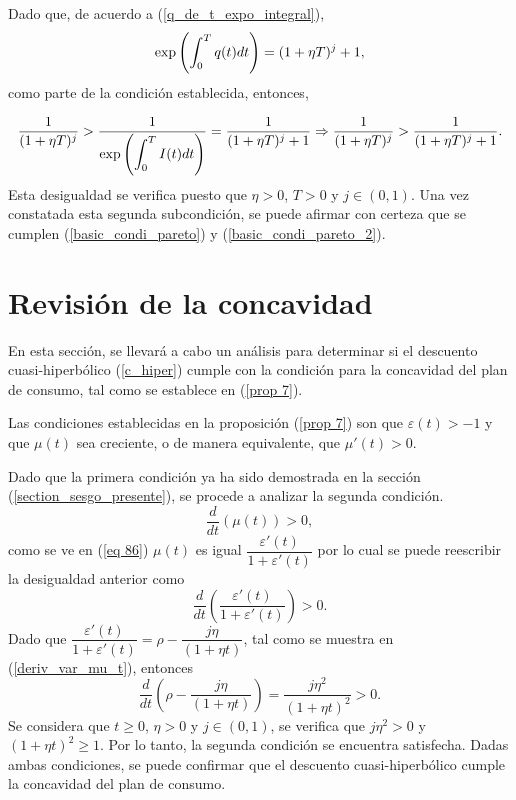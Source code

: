 Dado que, de acuerdo a (\ref{q_de_t_expo_integral}),
$$\exp\left(\displaystyle \int_0^{T}q(t)dt\right)=(1+\eta T)^j+1,$$
como parte de la condición establecida, entonces,

$$\dfrac{1}{(1+\eta T)^j} >  \dfrac{1}{\exp\left(\displaystyle \int_0^{T}I(t)dt\right)}=\dfrac{1}{(1+\eta T)^j+1} \Rightarrow
\dfrac{1}{(1+\eta T)^j} > \dfrac{1}{(1+\eta T)^j+1}.$$
Esta desigualdad se verifica puesto que $\eta>0$, $T>0$ y $j \in (0,1)$. 
Una vez constatada esta segunda subcondición, se puede afirmar con certeza que se cumplen (\ref{basic_condi_pareto}) y (\ref{basic_condi_pareto_2}).


\section{Revisión de la concavidad}
En esta sección, se llevará a cabo un análisis para determinar si el descuento cuasi-hiperbólico (\ref{c_hiper}) cumple con la condición para la concavidad del plan de consumo, tal como se establece en (\ref{prop 7}).

Las condiciones establecidas en la proposición (\ref{prop 7}) son que $\varepsilon(t) > -1$ y que $\mu(t)$ sea creciente, o de manera equivalente, que $\mu'(t) > 0$.

Dado que la primera condición ya ha sido demostrada en la sección (\ref{section_sesgo_presente}), se procede a analizar la segunda condición.
$$\dfrac{d}{dt}\left(\mu(t)\right)>0,$$
como se ve en (\ref{eq 86}) $\mu(t)$ es igual $\dfrac{\varepsilon'(t)}{1+\varepsilon'(t)}$ por lo cual se puede reescribir la desigualdad anterior como
$$\dfrac{d}{dt}\left(\dfrac{\varepsilon'(t)}{1+\varepsilon'(t)}\right)>0.$$
Dado que $\dfrac{\varepsilon'(t)}{1+\varepsilon'(t)}=\rho - \dfrac{j \eta}{(1+\eta t)}$, tal como se muestra en (\ref{deriv_var_mu_t}), entonces 
$$\dfrac{d}{dt}\left(\rho - \dfrac{j \eta}{(1+\eta t)}\right)=\dfrac{j\eta^2}{(1+\eta t)^2}>0.$$
Se considera que $t\geq 0$, $\eta>0$ y $j\in (0,1)$, se verifica que $j\eta^2>0$ y $(1+\eta t)^{2}\geq 1$. Por lo tanto, la segunda condición se encuentra satisfecha. Dadas ambas condiciones, se puede confirmar que el descuento cuasi-hiperbólico cumple la concavidad del plan de consumo.